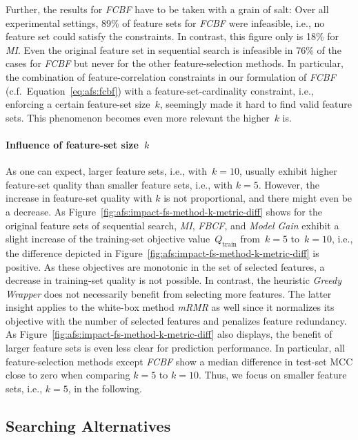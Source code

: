 \documentclass{article}
\theoremstyle{definition}
\begin{document}
Further, the results for \emph{FCBF} have to be taken with a grain of salt:
Over all experimental settings, 89\% of feature sets for \emph{FCBF} were infeasible, i.e., no feature set could satisfy the constraints.
In contrast, this figure only is 18\% for \emph{MI}.
Even the original feature set in sequential search is infeasible in 76\% of the cases for \emph{FCBF} but never for the other feature-selection methods.
In particular, the combination of feature-correlation constraints in our formulation of \emph{FCBF} (c.f.~Equation~\ref{eq:afs:fcbf}) with a feature-set-cardinality constraint, i.e., enforcing a certain feature-set size~$k$, seemingly made it hard to find valid feature sets.
This phenomenon becomes even more relevant the higher~$k$ is.

\paragraph{Influence of feature-set size~$k$}

As one can expect, larger feature sets, i.e., with~$k=10$, usually exhibit higher feature-set quality than smaller feature sets, i.e., with $k=5$.
However, the increase in feature-set quality with $k$ is not proportional, and there might even be a decrease.
As Figure~\ref{fig:afs:impact-fs-method-k-metric-diff} shows for the original feature sets of sequential search, \emph{MI}, \emph{FBCF}, and \emph{Model Gain} exhibit a slight increase of the training-set objective value~$Q_\text{train}$ from~$k=5$ to~$k=10$, i.e., the difference depicted in Figure~\ref{fig:afs:impact-fs-method-k-metric-diff} is positive.
As these objectives are monotonic in the set of selected features, a decrease in training-set quality is not possible.
In contrast, the heuristic \emph{Greedy Wrapper} does not necessarily benefit from selecting more features.
The latter insight applies to the white-box method \emph{mRMR} as well since it normalizes its objective with the number of selected features and penalizes feature redundancy.
As Figure~\ref{fig:afs:impact-fs-method-k-metric-diff} also displays, the benefit of larger feature sets is even less clear for prediction performance.
In particular, all feature-selection methods except \emph{FCBF} show a median difference in test-set MCC close to zero when comparing $k=5$ to $k=10$.
Thus, we focus on smaller feature sets, i.e., $k=5$, in the following.

\subsection{Searching Alternatives}
\label{sec:afs:evaluation:search}
\end{document}
